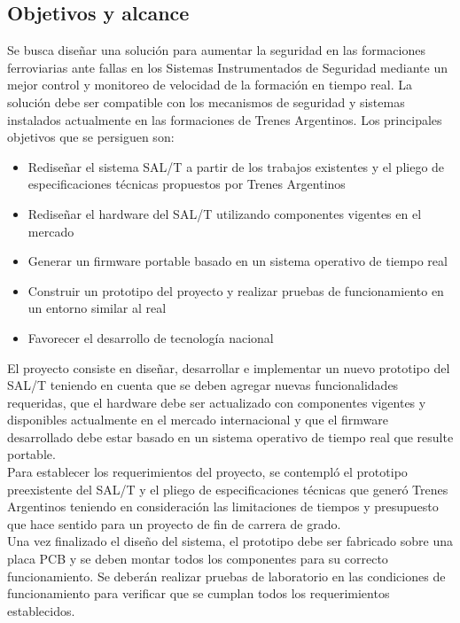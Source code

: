 \subsection{Objetivos y alcance}

Se busca diseñar una solución para aumentar la seguridad en las formaciones ferroviarias ante fallas en los Sistemas Instrumentados de Seguridad mediante un mejor control y monitoreo de velocidad de la formación en tiempo real. La solución debe ser compatible con los mecanismos de seguridad y sistemas instalados actualmente en las formaciones de Trenes Argentinos. Los principales objetivos que se persiguen son:


\begin{itemize}
    \item Rediseñar el sistema SAL/T a partir de los trabajos existentes y el pliego de especificaciones técnicas propuestos por Trenes Argentinos 
    \item Rediseñar el hardware del SAL/T utilizando componentes vigentes en el mercado
    \item Generar un firmware portable basado en un sistema operativo de tiempo real
    \item Construir un prototipo del proyecto y realizar pruebas de funcionamiento en un entorno similar al real
    \item Favorecer el desarrollo de tecnología nacional 
\end{itemize}


El proyecto consiste en diseñar, desarrollar e implementar un nuevo prototipo del SAL/T teniendo en cuenta que se deben agregar nuevas funcionalidades requeridas, que el hardware debe ser actualizado con componentes vigentes y disponibles actualmente en el mercado internacional y que el firmware desarrollado debe estar basado en un sistema operativo de tiempo real que resulte portable. \\

Para establecer los requerimientos del proyecto, se contempló el prototipo preexistente del SAL/T y el pliego de especificaciones técnicas que generó Trenes Argentinos teniendo en consideración las limitaciones de tiempos y presupuesto que hace sentido para un proyecto de fin de carrera de grado. \\

Una vez finalizado el diseño del sistema, el prototipo debe ser fabricado sobre una placa PCB y se deben montar todos los componentes para su correcto funcionamiento. Se deberán realizar pruebas de laboratorio en las condiciones de funcionamiento para verificar que se cumplan todos los requerimientos establecidos. 